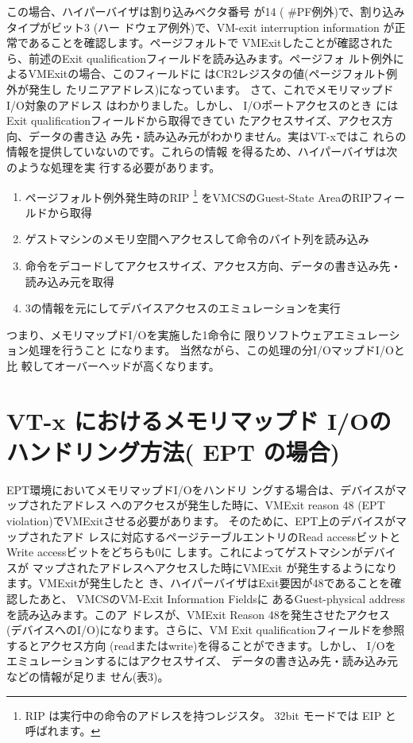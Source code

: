 \documentclass[a4j,12pt]{jarticle}
\begin{document}
 この場合、ハイパーバイザは割り込みベクタ番号
が14 ( \#PF例外)で、割り込みタイプがビット3 (ハー
ドウェア例外)で、VM-exit interruption information
が正常であることを確認します。ページフォルトで
VMExitしたことが確認されたら、前述のExit
qualificationフィールドを読み込みます。ページフォ
ルト例外によるVMExitの場合、このフィールドに
はCR2レジスタの値(ページフォルト例外が発生し
たリニアアドレス)になっています。
 さて、これでメモリマップドI/O対象のアドレス
はわかりました。しかし、 I/Oポートアクセスのとき
にはExit qualificationフィールドから取得できてい
たアクセスサイズ、アクセス方向、データの書き込
み先・読み込み元がわかりません。実はVT-xではこ
れらの情報を提供していないのです。これらの情報
を得るため、ハイパーバイザは次のような処理を実
行する必要があります。

\begin{enumerate}

\item{ページフォルト例外発生時のRIP
  \footnote[2]{
  RIP は実行中の命令のアドレスを持つレジスタ。 32bit モードでは EIP と呼ばれます。
  }
をVMCSのGuest-State AreaのRIPフィールドから取得}
\item{ゲストマシンのメモリ空間へアクセスして命令のバイト列を読み込み}
\item{命令をデコードしてアクセスサイズ、アクセス方向、データの書き込み先・読み込み元を取得}
\item{3の情報を元にしてデバイスアクセスのエミュレーションを実行}
\end{enumerate}

 つまり、メモリマップドI/Oを実施した1命令に
限りソフトウェアエミュレーション処理を行うこと
になります。
 当然ながら、この処理の分I/OマップドI/Oと比
較してオーバーヘッドが高くなります。


\section{VT-x におけるメモリマップド I/Oのハンドリング方法( EPT の場合)}

 EPT環境においてメモリマップドI/Oをハンドリ
ングする場合は、デバイスがマップされたアドレス
へのアクセスが発生した時に、VMExit reason 48
(EPT violation)でVMExitさせる必要があります。
そのために、EPT上のデバイスがマップされたアド
レスに対応するページテーブルエントリのRead
accessビットとWrite accessビットをどちらも0に
します。これによってゲストマシンがデバイスが
マップされたアドレスへアクセスした時にVMExit
が発生するようになります。VMExitが発生したと
き、ハイパーバイザはExit要因が48であることを確
認したあと、 VMCSのVM-Exit Information Fieldsに
あるGuest-physical addressを読み込みます。このア
ドレスが、VMExit Reason 48を発生させたアクセス
(デバイスへのI/O)になります。さらに、VM Exit
qualificationフィールドを参照するとアクセス方向
(readまたはwrite)を得ることができます。しかし、
I/Oをエミュレーションするにはアクセスサイズ、
データの書き込み先・読み込み元などの情報が足りま
せん(表3)。
\end{document}

